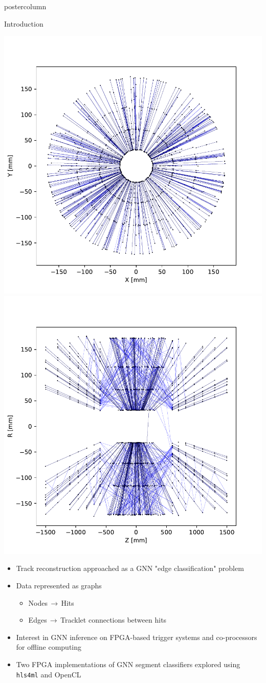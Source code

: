 \documentclass[final,hyperref={pdfpagelabels=false}]{beamer}
\newcommand{\hlsfml}{{\texttt{hls4ml}}\xspace}
\begin{document}
\begin{frame}
\begin{columns}
\begin{column}{.49\textwidth}
\begin{beamercolorbox}[center,wd=\textwidth]{postercolumn}
\begin{minipage}[T]{.95\textwidth}
{            \begin{block}{Introduction}
                  \begin{center}
                    \includegraphics[width=0.33\linewidth]{figures/event000001000_section0_xy.pdf}
                     \includegraphics[width=0.33\linewidth]{figures/event000001000_section0_rz.pdf}
                  \end{center}
                  \begin{itemize}
                    \item Track reconstruction approached as a GNN "edge classification" problem
                    \item Data represented as graphs
                    \begin{itemize}
                        \item Nodes$\,\to\,$Hits
                        \item Edges$\,\to\,$Tracklet connections between hits
                    \end{itemize}
                    \item Interest in GNN inference on FPGA-based trigger systems and co-processors for offline computing
                    \item Two FPGA implementations of GNN segment classifiers explored using {\hlsfml} and OpenCL
              \end{itemize}
            \end{block}

}
\end{minipage}
\end{beamercolorbox}
\end{column}
\end{columns}
\end{frame}
\end{document}
